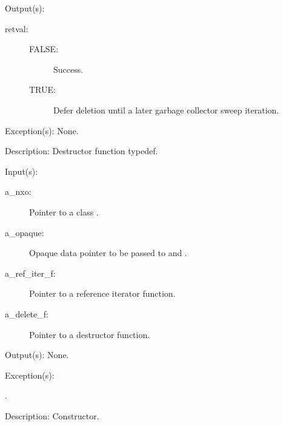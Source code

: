 \begin{capi}
\begin{capilist}
\begin{description}
		\end{description}
	\item[Output(s): ]
		\begin{description}\item[]
		\item[retval: ]
			\begin{description}\item[]
			\item[FALSE: ] Success.
			\item[TRUE: ] Defer deletion until a later garbage
			collector sweep iteration.
			\end{description}
		\end{description}
	\item[Exception(s): ] None.
	\item[Description: ]
		Destructor function typedef.
	\end{capilist}
\label{nxo_class_new}
	\begin{capilist}
	\item[Input(s): ]
		\begin{description}\item[]
		\item[a\_nxo: ]
			Pointer to a class .
		\item[a\_opaque: ]
			Opaque data pointer to be passed to
			 and .
		\item[a\_ref\_iter\_f: ]
			Pointer to a reference iterator function.
		\item[a\_delete\_f: ]
			Pointer to a destructor function.
		\end{description}
	\item[Output(s): ] None.
	\item[Exception(s): ]
		\begin{description}\item[]
		\item[.]
		\end{description}
	\item[Description: ]
		Constructor.
	\end{capilist}
\label{nxo_class_name_get}
	\begin{capilist}

\end{capilist}
\end{capi}
